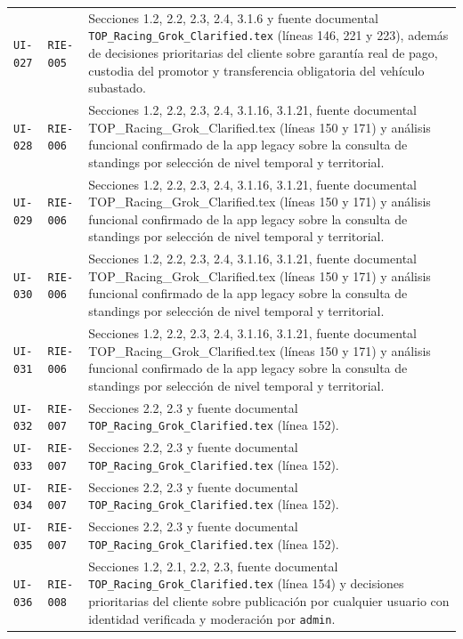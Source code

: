 \documentclass[10pt,letterpaper]{article}
\begin{document}
\begin{landscape}
\begin{longtable}{P{2.7cm}P{2.6cm}P{15.7cm}}
\texttt{UI-027} & \texttt{RIE-005} & Secciones 1.2, 2.2, 2.3, 2.4, 3.1.6 y fuente documental \texttt{TOP\_Racing\_Grok\_Clarified.tex} (líneas 146, 221 y 223), además de decisiones prioritarias del cliente sobre garantía real de pago, custodia del promotor y transferencia obligatoria del vehículo subastado.\\
\texttt{UI-028} & \texttt{RIE-006} & Secciones 1.2, 2.2, 2.3, 2.4, 3.1.16, 3.1.21, fuente documental TOP\_Racing\_Grok\_Clarified.tex (líneas 150 y 171) y análisis funcional confirmado de la app legacy sobre la consulta de standings por selección de nivel temporal y territorial.\\
\texttt{UI-029} & \texttt{RIE-006} & Secciones 1.2, 2.2, 2.3, 2.4, 3.1.16, 3.1.21, fuente documental TOP\_Racing\_Grok\_Clarified.tex (líneas 150 y 171) y análisis funcional confirmado de la app legacy sobre la consulta de standings por selección de nivel temporal y territorial.\\
\texttt{UI-030} & \texttt{RIE-006} & Secciones 1.2, 2.2, 2.3, 2.4, 3.1.16, 3.1.21, fuente documental TOP\_Racing\_Grok\_Clarified.tex (líneas 150 y 171) y análisis funcional confirmado de la app legacy sobre la consulta de standings por selección de nivel temporal y territorial.\\
\texttt{UI-031} & \texttt{RIE-006} & Secciones 1.2, 2.2, 2.3, 2.4, 3.1.16, 3.1.21, fuente documental TOP\_Racing\_Grok\_Clarified.tex (líneas 150 y 171) y análisis funcional confirmado de la app legacy sobre la consulta de standings por selección de nivel temporal y territorial.\\
\texttt{UI-032} & \texttt{RIE-007} & Secciones 2.2, 2.3 y fuente documental \texttt{TOP\_Racing\_Grok\_Clarified.tex} (línea 152).\\
\texttt{UI-033} & \texttt{RIE-007} & Secciones 2.2, 2.3 y fuente documental \texttt{TOP\_Racing\_Grok\_Clarified.tex} (línea 152).\\
\texttt{UI-034} & \texttt{RIE-007} & Secciones 2.2, 2.3 y fuente documental \texttt{TOP\_Racing\_Grok\_Clarified.tex} (línea 152).\\
\texttt{UI-035} & \texttt{RIE-007} & Secciones 2.2, 2.3 y fuente documental \texttt{TOP\_Racing\_Grok\_Clarified.tex} (línea 152).\\
\texttt{UI-036} & \texttt{RIE-008} & Secciones 1.2, 2.1, 2.2, 2.3, fuente documental \texttt{TOP\_Racing\_Grok\_Clarified.tex} (línea 154) y decisiones prioritarias del cliente sobre publicación por cualquier usuario con identidad verificada y moderación por \texttt{admin}.\\

\end{longtable}
\end{landscape}
\end{document}
